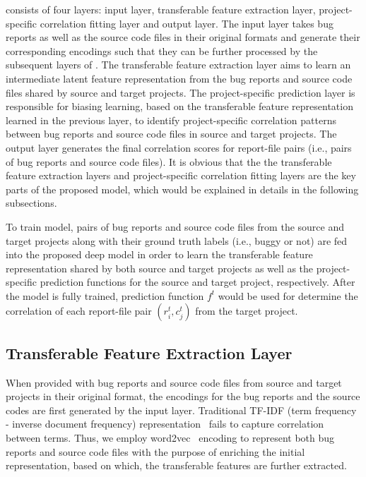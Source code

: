 \TRANPCNN consists of four layers: input layer, transferable feature extraction layer, project-specific correlation fitting layer and output layer. The input layer takes bug reports as well as the source code files in their original formats and generate their corresponding encodings such that they can be further processed by the subsequent layers of \TRANPCNN. The transferable feature extraction layer aims to learn an intermediate latent feature representation from the bug reports and source code files shared by source and target projects.  The project-specific prediction layer is responsible for biasing learning, based on the transferable feature representation learned in the previous layer, to identify project-specific correlation patterns between bug reports and source code files in source and target projects. The output layer generates the final correlation scores for report-file pairs (i.e., pairs of bug reports and source code files). It is obvious that the the transferable feature extraction layers and project-specific correlation fitting layers are the key parts of the proposed model, which would be explained in details in the following subsections.

To train \TRANPCNN model, pairs of bug reports and source code files from the source and target projects along with their ground truth labels (i.e., buggy or not) are fed into the proposed deep model in order to learn the transferable feature representation shared by both source and target projects as well as the project-specific prediction functions for the source and target project, respectively. After the model is fully trained, prediction function $f^{t}$ would be used for determine the correlation of each report-file pair $(r_i^t, c_j^t)$ from the target project.

\subsection{Transferable Feature Extraction Layer}

When provided with bug reports and source code files from source and target projects in their original format, the encodings for the bug reports and the source codes are first generated by the input layer. Traditional TF-IDF (term frequency - inverse document frequency) representation~\cite{christopher2008introduction} fails to capture correlation between terms. Thus, we employ word2vec~\cite{abs-1301-3781} encoding to represent both bug reports and source code files with the purpose of enriching the initial representation, based on which, the transferable features are further extracted.

